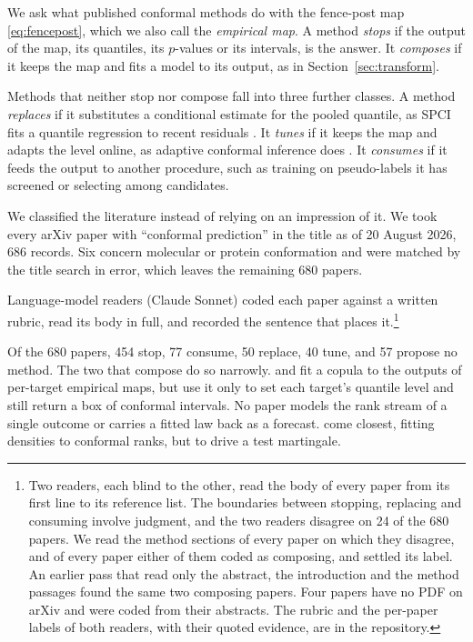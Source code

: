\documentclass[11pt]{article}
\theoremstyle{remark}
\begin{document}
We ask what published conformal methods do with the fence-post map
\eqref{eq:fencepost}, which we also call the \emph{empirical map}. A method
\emph{stops} if the output of the map, its quantiles, its $p$-values or its
intervals, is the answer. It \emph{composes} if it keeps the map and fits a model to
its output, as in Section~\ref{sec:transform}.

Methods that neither stop nor compose fall into three further classes. A method
\emph{replaces} if it substitutes a conditional estimate for the pooled quantile, as
SPCI fits a quantile regression to recent residuals \citep{xu2023spci}. It
\emph{tunes} if it keeps the map and adapts the level online, as adaptive conformal
inference does \citep{gibbs2021adaptive}. It \emph{consumes} if it feeds the output
to another procedure, such as training on pseudo-labels it has screened or selecting
among candidates.

We classified the literature instead of relying on an impression of it. We took every arXiv paper with ``conformal prediction'' in the title as of
20 August 2026, 686 records. Six concern molecular or protein conformation and were
matched by the title search in error, which leaves the remaining 680 papers.

Language-model readers (Claude Sonnet) coded each paper against a written rubric, read its body in
full, and recorded the sentence that places it.\footnote{Two readers, each blind to the other, read the body of
every paper from its first line to its reference list. The boundaries between
stopping, replacing and consuming involve judgment, and the two readers disagree on
24 of the 680 papers. We read the method sections of
every paper on which they disagree, and of every paper either of them coded as
composing, and settled its label. An earlier pass that read only the abstract, the
introduction and the method passages found the same two composing papers. Four papers
have no PDF on arXiv and were coded from their abstracts. The rubric and the per-paper
labels of both readers, with their quoted evidence, are in the repository.}

Of the 680 papers, 454 stop, 77 consume, 50 replace, 40 tune, and 57 propose no
method. The two that compose do so narrowly. \citet{messoudi2021copula} and
\citet{park2024semiparametric} fit a copula to the outputs of per-target empirical
maps, but use it only to set each target's quantile level and still return a box of
conformal intervals. No paper models the rank stream of a single outcome or carries a
fitted law back as a forecast. \citet{lardy2024anytime} come closest, fitting
densities to conformal ranks, but to drive a test martingale.
\end{document}
